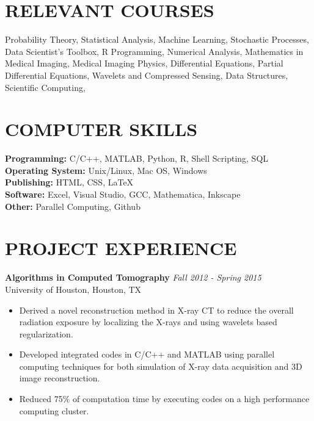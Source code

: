 \documentclass[margin,line,10pt]{res} %
\begin{document}
\begin{resume}
\section{RELEVANT COURSES} 
Probability Theory, 
Statistical Analysis, 
Machine Learning, 
Stochastic Processes, 
Data Scientist's Toolbox,
R Programming,
Numerical Analysis, 
Mathematics in Medical Imaging,
Medical Imaging Physics, 
Differential Equations, 
Partial Differential Equations,
Wavelets and Compressed Sensing,
Data Structures, 
Scientific Computing, 

\section{COMPUTER SKILLS} 

{\bf Programming:}  C/C++, MATLAB, Python, R, Shell Scripting, SQL \\
{\bf Operating System:} Unix/Linux, Mac OS, Windows \\
{\bf Publishing:}  HTML, CSS, \LaTeX \\
{\bf Software:} Excel, Visual Studio, GCC, Mathematica, Inkscape \\
{\bf Other:} Parallel Computing, Github

\section{PROJECT EXPERIENCE}
\textbf{Algorithms in Computed Tomography} \hfill {\em Fall 2012 - Spring 2015} \\
University of Houston, Houston, TX
\begin{itemize}[leftmargin=12pt] \itemsep -2pt
\item Derived a novel reconstruction method in X-ray CT to reduce the overall radiation exposure by localizing the X-rays and using wavelets based regularization.
\item Developed integrated codes in C/C++ and MATLAB using parallel computing techniques for both simulation of X-ray data acquisition and 3D image reconstruction.
\item Reduced 75\% of computation time by executing codes on a high performance computing cluster.
\end{itemize}


\end{resume}
\end{document}
